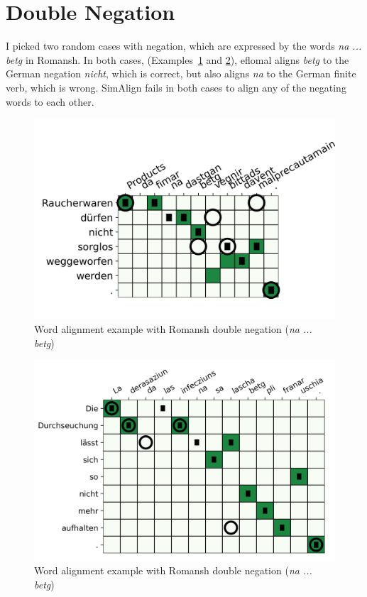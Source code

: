 \section{Double Negation}
I picked two random cases with negation, which are expressed by the words \emph{na ... 
betg} in Romansh. 
In both cases, (Examples~\ref{fig:na-betg1} and \ref{fig:na-betg2}), eflomal aligns \emph{betg} to the German negation \emph{nicht}, which is correct, but also aligns \emph{na} to the German finite verb, which is wrong. 
SimAlign fails in both cases to align any of the negating words to each other.

\begin{figure}
\includegraphics{graphics/alignments/example5.png}
\caption{Word alignment example with Romansh double negation (\emph{na ... 
betg})}
\label{fig:na-betg1}
\end{figure}

\begin{figure}
\includegraphics{graphics/alignments/example6-na_betg.png}
\caption{Word alignment example with Romansh double negation (\emph{na ... 
betg})}
\label{fig:na-betg2}
\end{figure}


